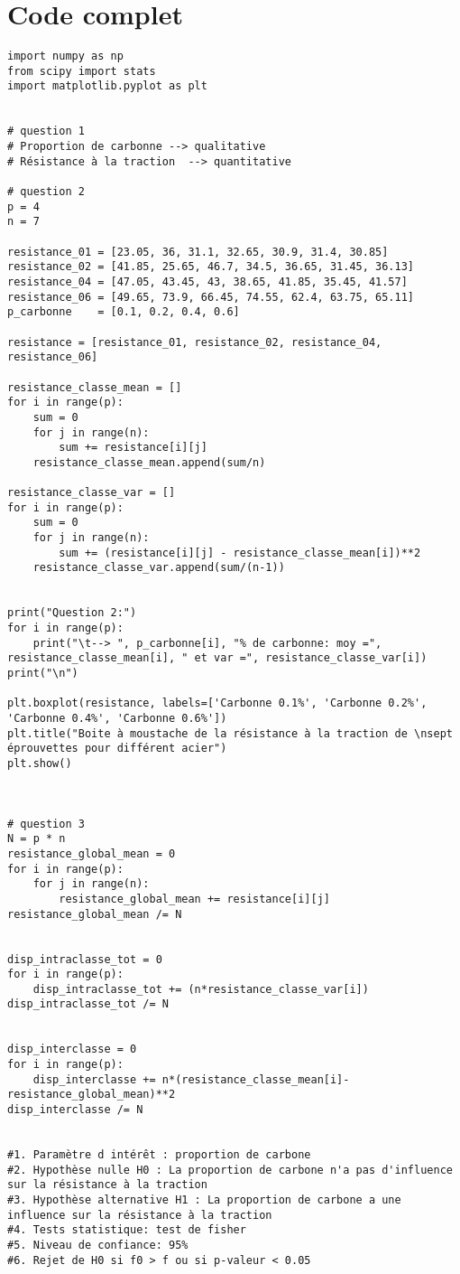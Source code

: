 \clearpage
\section{Code complet}
\begin{lstlisting}[style=myPython, caption=Code Python complet TP6, frame=lines]
import numpy as np
from scipy import stats
import matplotlib.pyplot as plt


# question 1
# Proportion de carbonne --> qualitative
# Résistance à la traction  --> quantitative

# question 2
p = 4
n = 7

resistance_01 = [23.05, 36, 31.1, 32.65, 30.9, 31.4, 30.85]
resistance_02 = [41.85, 25.65, 46.7, 34.5, 36.65, 31.45, 36.13]
resistance_04 = [47.05, 43.45, 43, 38.65, 41.85, 35.45, 41.57]
resistance_06 = [49.65, 73.9, 66.45, 74.55, 62.4, 63.75, 65.11]
p_carbonne    = [0.1, 0.2, 0.4, 0.6]

resistance = [resistance_01, resistance_02, resistance_04, resistance_06]

resistance_classe_mean = []
for i in range(p):
    sum = 0
    for j in range(n):
        sum += resistance[i][j]
    resistance_classe_mean.append(sum/n)

resistance_classe_var = []
for i in range(p):
    sum = 0
    for j in range(n):
        sum += (resistance[i][j] - resistance_classe_mean[i])**2
    resistance_classe_var.append(sum/(n-1))


print("Question 2:")
for i in range(p):
    print("\t--> ", p_carbonne[i], "% de carbonne: moy =", resistance_classe_mean[i], " et var =", resistance_classe_var[i])
print("\n")

plt.boxplot(resistance, labels=['Carbonne 0.1%', 'Carbonne 0.2%', 'Carbonne 0.4%', 'Carbonne 0.6%'])
plt.title("Boite à moustache de la résistance à la traction de \nsept éprouvettes pour différent acier")
plt.show()



# question 3
N = p * n
resistance_global_mean = 0
for i in range(p):
    for j in range(n):
        resistance_global_mean += resistance[i][j]
resistance_global_mean /= N


disp_intraclasse_tot = 0
for i in range(p):
    disp_intraclasse_tot += (n*resistance_classe_var[i])
disp_intraclasse_tot /= N


disp_interclasse = 0
for i in range(p):
    disp_interclasse += n*(resistance_classe_mean[i]-resistance_global_mean)**2
disp_interclasse /= N


#1. Paramètre d intérêt : proportion de carbone
#2. Hypothèse nulle H0 : La proportion de carbone n'a pas d'influence sur la résistance à la traction
#3. Hypothèse alternative H1 : La proportion de carbone a une influence sur la résistance à la traction
#4. Tests statistique: test de fisher
#5. Niveau de confiance: 95%
#6. Rejet de H0 si f0 > f ou si p-valeur < 0.05


\end{lstlisting}
